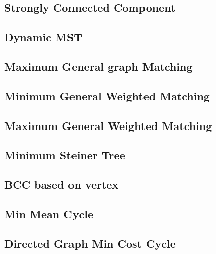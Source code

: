 \documentclass[a4paper,10pt,twocolumn,oneside]{article}
\begin{document}
%

\subsection{Strongly Connected Component}


\subsection{Dynamic MST}


\subsection{Maximum General graph Matching}


\subsection{Minimum General Weighted Matching}


\subsection{Maximum General Weighted Matching}


\subsection{Minimum Steiner Tree}


\subsection{BCC based on vertex}


\subsection{Min Mean Cycle}


\subsection{Directed Graph Min Cost Cycle}

\end{document}
